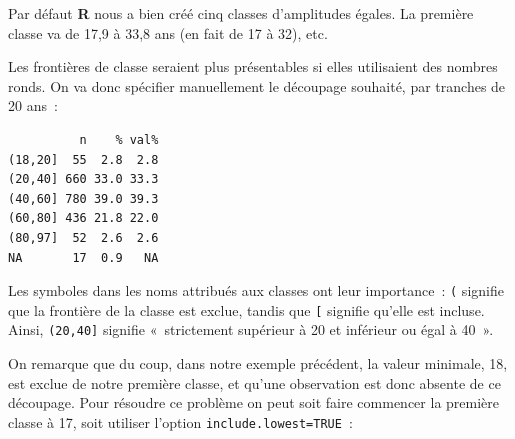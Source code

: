 \documentclass[
  letterpaper,
  DIV=11,
  numbers=noendperiod,
  oneside]{scrreprt}
\newenvironment{Shaded}{\begin{snugshade}}{\end{snugshade}}
\newcommand{\AttributeTok}[1]{\textcolor[rgb]{0.40,0.45,0.13}{#1}}
\newcommand{\ConstantTok}[1]{\textcolor[rgb]{0.56,0.35,0.01}{#1}}
\newcommand{\DecValTok}[1]{\textcolor[rgb]{0.68,0.00,0.00}{#1}}
\newcommand{\FunctionTok}[1]{\textcolor[rgb]{0.28,0.35,0.67}{#1}}
\newcommand{\NormalTok}[1]{\textcolor[rgb]{0.00,0.23,0.31}{#1}}
\newcommand{\OtherTok}[1]{\textcolor[rgb]{0.00,0.23,0.31}{#1}}
\newcommand{\SpecialCharTok}[1]{\textcolor[rgb]{0.37,0.37,0.37}{#1}}
\begin{document}
Par défaut \textbf{R} nous a bien créé cinq classes d'amplitudes égales.
La première classe va de 17,9 à 33,8 ans (en fait de 17 à 32), etc.

Les frontières de classe seraient plus présentables si elles utilisaient
des nombres ronds. On va donc spécifier manuellement le découpage
souhaité, par tranches de 20 ans~:

\begin{Shaded}
\end{Shaded}

\begin{verbatim}
          n    % val%
(18,20]  55  2.8  2.8
(20,40] 660 33.0 33.3
(40,60] 780 39.0 39.3
(60,80] 436 21.8 22.0
(80,97]  52  2.6  2.6
NA       17  0.9   NA
\end{verbatim}

Les symboles dans les noms attribués aux classes ont leur importance~:
\texttt{(} signifie que la frontière de la classe est exclue, tandis que
\texttt{{[}} signifie qu'elle est incluse. Ainsi, \texttt{(20,40{]}}
signifie «~strictement supérieur à 20 et inférieur ou égal à 40~».

On remarque que du coup, dans notre exemple précédent, la valeur
minimale, 18, est exclue de notre première classe, et qu'une observation
est donc absente de ce découpage. Pour résoudre ce problème on peut soit
faire commencer la première classe à 17, soit utiliser l'option
\texttt{include.lowest=TRUE}~:

\begin{Shaded}
\end{Shaded}
\end{document}
